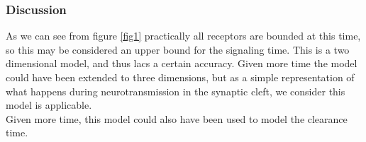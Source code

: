 \subsubsection{Discussion}
As we can see from figure \ref{fig1} practically all receptors are bounded at this time, so this may be considered an upper bound for the signaling time. This is a two dimensional model, and thus lacs a certain accuracy. Given more time the model could have been extended to three dimensions, but as a simple representation of what happens during neurotransmission in the synaptic cleft, we consider this model is applicable.\\ Given more time, this model could also have been used to model the clearance time.